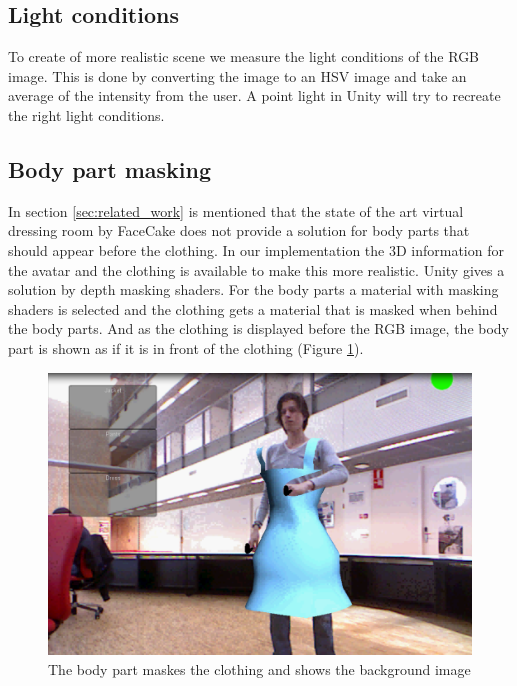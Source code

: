 \documentclass[a4paper]{article}
\begin{document}
\subsection{Light conditions}
\label{sec:light_conditions}
To create of more realistic scene we measure the light conditions of the RGB image. This is done by converting the image to an HSV image and take an average of the intensity from the user.
A point light in Unity will try to recreate the right light conditions.

\subsection{Body part masking}
\label{sec:bodypart_masking}
In section \ref{sec:related_work} is mentioned that the state of the art virtual dressing room by FaceCake does not provide a solution for body parts that should appear before the clothing. In our implementation the 3D information for the avatar and the clothing is available to make this more realistic. Unity gives a solution by depth masking shaders. For the body parts a material with masking shaders is selected and the clothing gets a material that is masked when behind the body parts. And as the clothing is displayed before the RGB image, the body part is shown as if it is in front of the clothing (Figure \ref{fig:shader}).

 \begin{figure}[htp]
\centering
\includegraphics[scale=0.3]{show_shader_morris.png} 
\caption{The body part maskes the clothing and shows the background image}
\label{fig:shader}
\end{figure}
\end{document}
